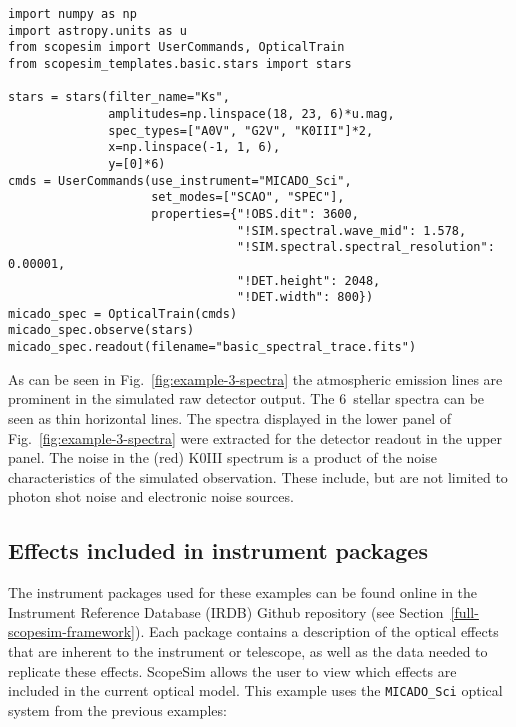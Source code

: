 \begin{lstlisting}[frame=single]
import numpy as np
import astropy.units as u
from scopesim import UserCommands, OpticalTrain
from scopesim_templates.basic.stars import stars

stars = stars(filter_name="Ks",
              amplitudes=np.linspace(18, 23, 6)*u.mag,
              spec_types=["A0V", "G2V", "K0III"]*2,
              x=np.linspace(-1, 1, 6),
              y=[0]*6)
cmds = UserCommands(use_instrument="MICADO_Sci",
                    set_modes=["SCAO", "SPEC"],
                    properties={"!OBS.dit": 3600,
                                "!SIM.spectral.wave_mid": 1.578,
                                "!SIM.spectral.spectral_resolution": 0.00001,
                                "!DET.height": 2048,
                                "!DET.width": 800})
micado_spec = OpticalTrain(cmds)
micado_spec.observe(stars)
micado_spec.readout(filename="basic_spectral_trace.fits")
\end{lstlisting}

As can be seen in Fig.~\ref{fig:example-3-spectra} the atmospheric emission lines are prominent in the simulated raw detector output.
The 6~stellar spectra can be seen as thin horizontal lines.
The spectra displayed in the lower panel of Fig.~\ref{fig:example-3-spectra} were extracted for the detector readout in the upper panel.
The noise in the (red) K0III spectrum is a product of the noise characteristics of the simulated observation.
These include, but are not limited to photon shot noise and electronic noise sources.


\subsection{Effects included in instrument packages}
\label{effects-included-in-instrument-packages}

The instrument packages used for these examples can be found online in the Instrument Reference Database (IRDB) Github repository (see Section~\ref{full-scopesim-framework}).
Each package contains a description of the optical effects that are inherent to the instrument or telescope, as well as the data needed to replicate these effects.
ScopeSim allows the user to view which effects are included in the current optical model.
This example uses the \lstinline{MICADO_Sci} optical system from the previous examples:


